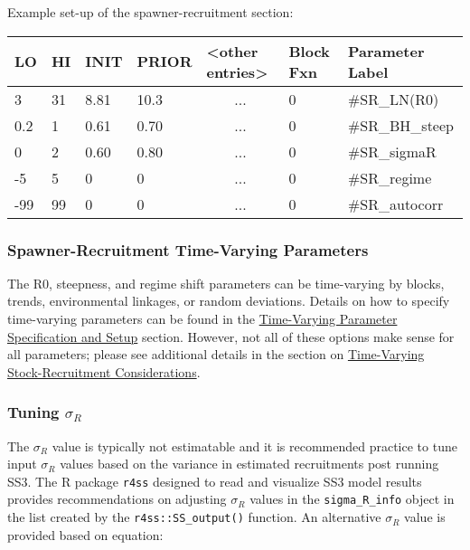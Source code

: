 Example set-up of the spawner-recruitment section:
\begin{center}
	\begin{longtable}{p{1cm} p{1cm} p{1cm} p{1.5cm} p{3cm} p{2cm} p{3.5cm}}
		
		\hline
		LO \Tstrut & HI & INIT & PRIOR & <other entries> & Block Fxn & Parameter Label \Bstrut\\
		\hline
		3   & 31 & 8.81 & 10.3 & \multicolumn{1}{c}{...} & 0 & \#SR\_LN(R0) \Tstrut\\
		0.2 & 1  & 0.61 & 0.70 & \multicolumn{1}{c}{...} & 0 & \#SR\_BH\_steep \\
		0   & 2  & 0.60 & 0.80 & \multicolumn{1}{c}{...} & 0 & \#SR\_sigmaR \\
		-5  & 5  & 0    & 0    & \multicolumn{1}{c}{...} & 0 & \#SR\_regime \\
		-99 & 99 & 0    & 0    & \multicolumn{1}{c}{...} & 0 & \#SR\_autocorr \Bstrut\\
		\hline
	\end{longtable}
\end{center}
\vspace*{-1.7\baselineskip}

\subsubsection{Spawner-Recruitment Time-Varying Parameters}

The R0, steepness, and regime shift parameters can be time-varying by blocks, trends, environmental linkages, or random deviations. Details on how to specify time-varying parameters can be found in the \hyperlink{tvOrder}{Time-Varying Parameter Specification and Setup} section. However, not all of these options make sense for all parameters; please see additional details in the section on \hyperlink{tv-sr}{Time-Varying Stock-Recruitment Considerations}.

\subsubsection{Tuning $\sigma_R$}
\hyperlink{TuneSigmaR}{}
The $\sigma_R$ value is typically not estimatable and it is recommended practice to tune input $\sigma_R$ values based on the variance in estimated recruitments post running SS3. The R package \texttt{r4ss} designed to read and visualize SS3 model results provides recommendations on adjusting $\sigma_R$ values in the \texttt{sigma\_R\_info} object in the list created by the \texttt{r4ss::SS\_output()} function. An alternative $\sigma_R$ value is provided based on equation:

